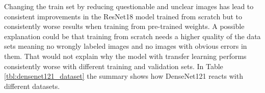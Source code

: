 \begin{table}[!h] \centering
{}
\caption{Dataset variations with ResNet18. The first column shows how the datasets performed when trained from scratch whereas the second column shows how the datasets performed with pre-training.}
\label{tbl:resnet18_dataset}
\end{table}

\quad

Changing the train set by reducing questionable and unclear images has lead to consistent improvements in the ResNet18 model trained from scratch but to consistently worse results when training from pre-trained weights. A possible explanation could be that training from scratch needs a higher quality of the data sets meaning no wrongly labeled images and no images with obvious errors in them. That would not explain why the model with transfer learning performs consistently worse with different training and validation sets. In Table \ref{tbl:densenet121_dataset} the summary shows how DenseNet121 reacts with different datasets. \\



